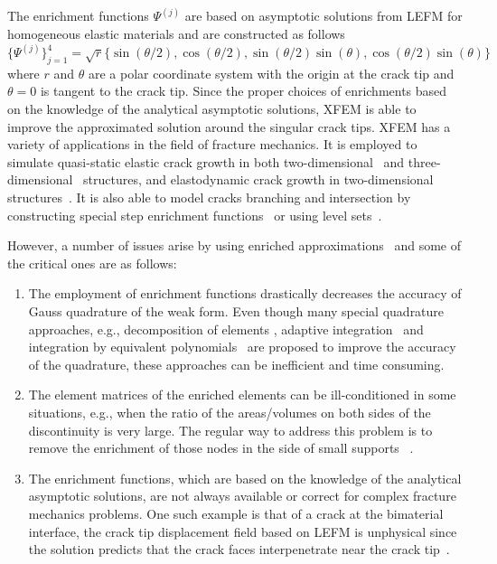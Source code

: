 \documentclass{article}
\begin{document}
The enrichment functions $\Psi^{(j)}$ are based on asymptotic solutions from LEFM for homogeneous elastic materials and  are constructed as follows~\cite{belytschko2013nonlinear}
\begin{equation}
	\{\Psi^{(j)}\}^4_{j=1} = \sqrt{r}\{\sin(\theta/2),\cos(\theta/2),\sin(\theta/2)\sin(\theta),\cos(\theta/2)\sin(\theta) \}
\end{equation}
where $r$ and $\theta$ are a polar coordinate system with the origin at the crack tip and $\theta = 0$ is tangent to the crack tip. Since the proper choices of enrichments based on the knowledge of the analytical asymptotic solutions, XFEM is able to improve the approximated solution around the singular crack tips. XFEM has a variety of applications in the field of fracture mechanics. It is employed to simulate quasi-static elastic crack growth in both two-dimensional~\cite{belytschko1999elastic,bordas2007extended,dolbow1999finite} and three-dimensional~\cite{sukumar2000extended,moes2002non,gravouil2002non} structures, and elastodynamic crack growth in two-dimensional structures~\cite{belytschko2003dynamic,song2006method}. It is also able to model cracks branching and intersection by constructing special step enrichment functions~\cite{daux2000arbitrary,xu2014modeling} or using level sets~\cite{belytschko2001arbitrary}.

However, a number of issues arise by using enriched approximations~\cite{fries2010extended} and some of the critical ones
are as follows:
\begin{enumerate}
	\item The employment of enrichment functions drastically decreases the accuracy of Gauss quadrature of the weak form. Even though many special quadrature approaches, e.g., decomposition of elements \cite{dolbow1999finite,belytschko2001arbitrary,sukumar2000extended,fries2008corrected}, adaptive integration~\cite{strouboulis2000design,strouboulis2000generalized,liu2004xfem,xiao2006improving} and integration by equivalent polynomials~\cite{iarve2003mesh,ventura2006elimination} are proposed to improve the accuracy of the quadrature, these approaches can be inefficient and time consuming. 
	\item The element matrices of the enriched elements can be ill-conditioned in some situations, e.g., when the ratio of the areas/volumes on both sides of the discontinuity is very large. The regular way to address this problem is to remove the enrichment of those nodes in the side of small supports ~\cite{daux2000arbitrary,liu2004xfem,bordas2007extended}. 
	\item The enrichment functions, which are based on the knowledge of the analytical asymptotic solutions, are not always available or correct for complex fracture mechanics problems. One such example is that of a crack at the bimaterial interface, the crack tip displacement field based on LEFM is unphysical since the solution predicts that the crack faces interpenetrate near the crack tip~\cite{england1965crack}.
\end{enumerate}
\end{document}
